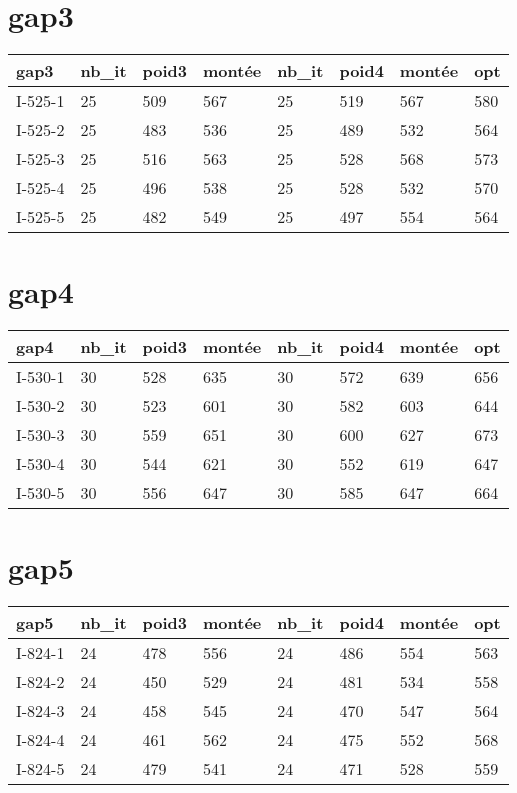 \documentclass[a4paper,12pt,titlepage]{report}
\begin{document}
\section{gap3}

\begin{tabular}{|l|l|l|l|l|l|l|l|}
  \hline
  gap3 & nb\_it & poid3 & montée & nb\_it & poid4 & montée & opt \\
  \hline
  I-525-1 & 25 & 509 & 567 & 25 & 519 & 567 & 580  \\
  I-525-2 & 25 & 483 & 536 & 25 & 489 & 532 & 564  \\
  I-525-3 & 25 & 516 & 563 & 25 & 528 & 568 & 573  \\
  I-525-4 & 25 & 496 & 538 & 25 & 528 & 532 & 570  \\
  I-525-5 & 25 & 482 & 549 & 25 & 497 & 554 & 564  \\
  \hline
\end{tabular}

\section{gap4}

\begin{tabular}{|l|l|l|l|l|l|l|l|}
  \hline
  gap4 & nb\_it & poid3 & montée & nb\_it & poid4 & montée & opt \\
  \hline
  I-530-1 & 30 & 528 & 635 & 30 & 572 & 639 & 656  \\
  I-530-2 & 30 & 523 & 601 & 30 & 582 & 603 & 644  \\
  I-530-3 & 30 & 559 & 651 & 30 & 600 & 627 & 673  \\
  I-530-4 & 30 & 544 & 621 & 30 & 552 & 619 & 647  \\
  I-530-5 & 30 & 556 & 647 & 30 & 585 & 647 & 664  \\
  \hline
\end{tabular}

\section{gap5}

\begin{tabular}{|l|l|l|l|l|l|l|l|}
  \hline
  gap5 & nb\_it & poid3 & montée & nb\_it & poid4 & montée & opt \\
  \hline
  I-824-1 & 24 & 478 & 556 & 24 & 486 & 554 & 563  \\
  I-824-2 & 24 & 450 & 529 & 24 & 481 & 534 & 558  \\
  I-824-3 & 24 & 458 & 545 & 24 & 470 & 547 & 564  \\
  I-824-4 & 24 & 461 & 562 & 24 & 475 & 552 & 568  \\
  I-824-5 & 24 & 479 & 541 & 24 & 471 & 528 & 559  \\
  \hline
\end{tabular}
\end{document}
